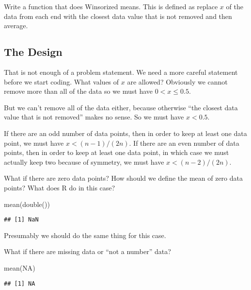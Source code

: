 \documentclass[
]{article}
\newenvironment{Shaded}{\begin{snugshade}}{\end{snugshade}}
\newcommand{\ConstantTok}[1]{\textcolor[rgb]{0.00,0.00,0.00}{#1}}
\newcommand{\FunctionTok}[1]{\textcolor[rgb]{0.00,0.00,0.00}{#1}}
\newcommand{\NormalTok}[1]{#1}
\begin{document}
Write a function that does Winsorized means. This is defined as replace
\(x\) of the data from each end with the closest data value that is not
removed and then average.

\hypertarget{the-design}{%
\subsection{The Design}\label{the-design}}

That is not enough of a problem statement. We need a more careful
statement before we start coding. What values of \(x\) are allowed?
Obviously we cannot remove more than all of the data so we must have
\(0 < x \le 0.5\).

But we can't remove all of the data either, because otherwise ``the
closest data value that is not removed'' makes no sense. So we must have
\(x < 0.5\).

If there are an odd number of data points, then in order to keep at
least one data point, we must have \(x < (n - 1) / (2 n)\). If there are
an even number of data points, then in order to keep at least one data
point, in which case we must actually keep two because of symmetry, we
must have \(x < (n - 2) / (2 n)\).

What if there are zero data points? How should we define the mean of
zero data points? What does R do in this case?

\begin{Shaded}
\begin{Highlighting}[]
\FunctionTok{mean}\NormalTok{(}\FunctionTok{double}\NormalTok{())}
\end{Highlighting}
\end{Shaded}

\begin{verbatim}
## [1] NaN
\end{verbatim}

Presumably we should do the same thing for this case.

What if there are missing data or ``not a number'' data?

\begin{Shaded}
\begin{Highlighting}[]
\FunctionTok{mean}\NormalTok{(}\ConstantTok{NA}\NormalTok{)}
\end{Highlighting}
\end{Shaded}

\begin{verbatim}
## [1] NA
\end{verbatim}
\end{document}
